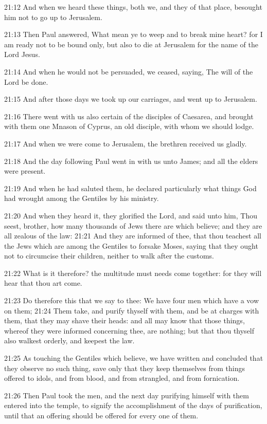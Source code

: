 21:12 And when we heard these things, both we, and they of that place, besought him not to go up to Jerusalem.

21:13 Then Paul answered, What mean ye to weep and to break mine heart?  for I am ready not to be bound only, but also to die at Jerusalem for the name of the Lord Jesus.

21:14 And when he would not be persuaded, we ceased, saying, The will of the Lord be done.

21:15 And after those days we took up our carriages, and went up to Jerusalem.

21:16 There went with us also certain of the disciples of Caesarea, and brought with them one Mnason of Cyprus, an old disciple, with whom we should lodge.

21:17 And when we were come to Jerusalem, the brethren received us gladly.

21:18 And the day following Paul went in with us unto James; and all the elders were present.

21:19 And when he had saluted them, he declared particularly what things God had wrought among the Gentiles by his ministry.

21:20 And when they heard it, they glorified the Lord, and said unto him, Thou seest, brother, how many thousands of Jews there are which believe; and they are all zealous of the law: 21:21 And they are informed of thee, that thou teachest all the Jews which are among the Gentiles to forsake Moses, saying that they ought not to circumcise their children, neither to walk after the customs.

21:22 What is it therefore? the multitude must needs come together: for they will hear that thou art come.

21:23 Do therefore this that we say to thee: We have four men which have a vow on them; 21:24 Them take, and purify thyself with them, and be at charges with them, that they may shave their heads: and all may know that those things, whereof they were informed concerning thee, are nothing; but that thou thyself also walkest orderly, and keepest the law.

21:25 As touching the Gentiles which believe, we have written and concluded that they observe no such thing, save only that they keep themselves from things offered to idols, and from blood, and from strangled, and from fornication.

21:26 Then Paul took the men, and the next day purifying himself with them entered into the temple, to signify the accomplishment of the days of purification, until that an offering should be offered for every one of them.

